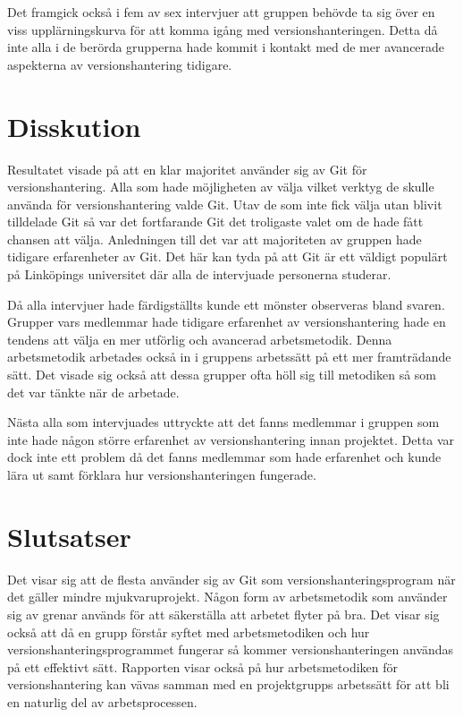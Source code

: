 Det framgick också i fem av sex intervjuer att gruppen behövde ta sig över en viss upplärningskurva för att komma igång med versionshanteringen. Detta då inte alla i de berörda grupperna hade kommit i kontakt med de mer avancerade aspekterna av versionshantering tidigare.

\section{Disskution}

Resultatet visade på att en klar majoritet använder sig av Git för versionshantering. Alla som hade möjligheten av välja vilket verktyg de skulle använda för versionshantering valde Git. Utav de som inte fick välja utan blivit tilldelade Git så var det fortfarande Git det troligaste valet om de hade fått chansen att välja. Anledningen till det var att majoriteten av gruppen hade tidigare erfarenheter av Git. Det här kan tyda på att Git är ett väldigt populärt på Linköpings universitet där alla de intervjuade personerna studerar.

Då alla intervjuer hade färdigställts kunde ett mönster observeras bland svaren. Grupper vars medlemmar hade tidigare erfarenhet av versionshantering hade en tendens att välja en mer utförlig och avancerad arbetsmetodik. Denna arbetsmetodik arbetades också in i gruppens arbetssätt på ett mer framträdande sätt. Det visade sig också att dessa grupper ofta höll sig till metodiken så som det var tänkte när de arbetade.

Nästa alla som intervjuades uttryckte att det fanns medlemmar i gruppen som inte hade någon större erfarenhet av versionshantering innan projektet. Detta var dock inte ett problem då det fanns medlemmar som hade erfarenhet och kunde lära ut samt förklara hur versionshanteringen fungerade.

\section{Slutsatser}

Det visar sig att de flesta använder sig av Git som versionshanteringsprogram när det gäller mindre mjukvaruprojekt. Någon form av arbetsmetodik som använder sig av grenar används för att säkerställa att arbetet flyter på bra. Det visar sig också att då en grupp förstår syftet med arbetsmetodiken och hur versionshanteringsprogrammet fungerar så kommer versionshanteringen användas på ett effektivt sätt. Rapporten visar också på hur arbetsmetodiken för versionshantering kan vävas samman med en projektgrupps arbetssätt för att bli en naturlig del av arbetsprocessen.
